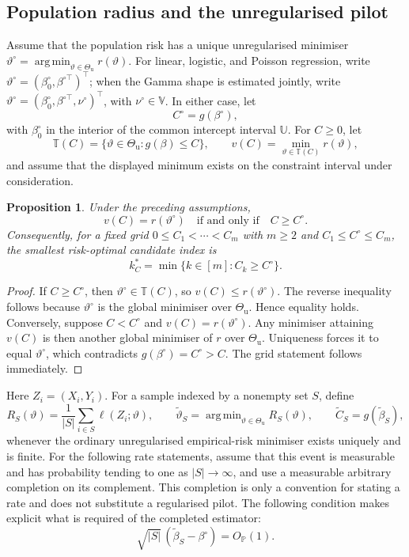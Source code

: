 \documentclass[12pt]{article}
\DeclareMathOperator*{\argmin}{arg\,min}
\newenvironment{bluechange}{\begingroup\color[rgb]{0.00,0.00,1.00}}{\endgroup}
\newtheorem{proposition}{Proposition}
\theoremstyle{remark}
\theoremstyle{plain}
\begin{document}
\begin{bluechange}
\subsection{Population radius and the unregularised pilot}
Assume that the population risk has a unique unregularised minimiser $\vartheta^\circ=\argmin_{\vartheta\in\Theta_{\mathrm u}}r(\vartheta)$. For linear, logistic, and Poisson regression, write $\vartheta^\circ=(\beta_0^\circ,\beta^{\circ\top})^\top$; when the Gamma shape is estimated jointly, write $\vartheta^\circ=(\beta_0^\circ,\beta^{\circ\top},\nu^\circ)^\top$, with $\nu^\circ\in\mathbb V$. In either case, let
\[
C^\circ=g(\beta^\circ),
\]
with $\beta_0^\circ$ in the interior of the common intercept interval $\mathbb U$. For $C\ge0$, let
\[
\mathbb T(C)=\{\vartheta\in\Theta_{\mathrm u}:g(\beta)\le C\},
\qquad
v(C)=\min_{\vartheta\in\mathbb T(C)}r(\vartheta),
\]
and assume that the displayed minimum exists on the constraint interval under consideration.

\begin{proposition}\label{Prop: population pilot radius}
Under the preceding assumptions,
\[
v(C)=r(\vartheta^\circ)\quad\text{if and only if}\quad C\ge C^\circ.
\]
Consequently, for a fixed grid $0\le C_1<\cdots<C_m$ with $m\ge2$ and $C_1\le C^\circ\le C_m$, the smallest risk-optimal candidate index is
\[
k_C^*=\min\{k\in[m]:C_k\ge C^\circ\}.
\]
\end{proposition}

\begin{proof}
If $C\ge C^\circ$, then $\vartheta^\circ\in\mathbb T(C)$, so $v(C)\le r(\vartheta^\circ)$. The reverse inequality follows because $\vartheta^\circ$ is the global minimiser over $\Theta_{\mathrm u}$. Hence equality holds. Conversely, suppose $C<C^\circ$ and $v(C)=r(\vartheta^\circ)$. Any minimiser attaining $v(C)$ is then another global minimiser of $r$ over $\Theta_{\mathrm u}$. Uniqueness forces it to equal $\vartheta^\circ$, which contradicts $g(\beta^\circ)=C^\circ>C$. The grid statement follows immediately.
\end{proof}

Here $Z_i=(X_i,Y_i)$. For a sample indexed by a nonempty set $S$, define
\[
R_S(\vartheta)=\frac{1}{|S|}\sum_{i\in S}\ell(Z_i;\vartheta),
\qquad
\widetilde\vartheta_S=\argmin_{\vartheta\in\Theta_{\mathrm u}}R_S(\vartheta),
\qquad
\widetilde C_S=g(\widetilde\beta_S),
\]
whenever the ordinary unregularised empirical-risk minimiser exists uniquely and is finite. For the following rate statements, assume that this event is measurable and has probability tending to one as $|S|\to\infty$, and use a measurable arbitrary completion on its complement. This completion is only a convention for stating a rate and does not substitute a regularised pilot. The following condition makes explicit what is required of the completed estimator:
\begin{equation}\label{Eqs: unregularised pilot rate}
\sqrt{|S|}\,(\widetilde\beta_S-\beta^\circ)=O_{\mathbb P}(1).
\end{equation}


\end{bluechange}
\end{document}
